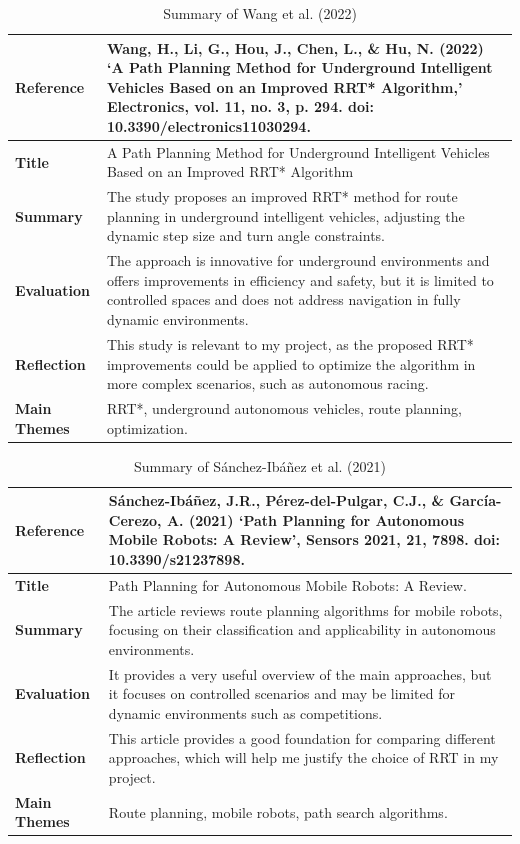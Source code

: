\documentclass[a4paper,11pt]{report}
\begin{document}
\begin{table}[H]
    \centering
    \begin{tabular}{|p{3cm}|p{10cm}|}
        \hline
        \textbf{Reference} & Wang, H., Li, G., Hou, J., Chen, L., \& Hu, N. (2022) ‘A Path Planning Method for Underground Intelligent Vehicles Based on an Improved RRT* Algorithm,’ Electronics, vol. 11, no. 3, p. 294. doi: 10.3390/electronics11030294. \\ \hline
        \textbf{Title} & A Path Planning Method for Underground Intelligent Vehicles Based on an Improved RRT* Algorithm \\ \hline
        \textbf{Summary} & The study proposes an improved RRT* method for route planning in underground intelligent vehicles, adjusting the dynamic step size and turn angle constraints. \\ \hline
        \textbf{Evaluation} & The approach is innovative for underground environments and offers improvements in efficiency and safety, but it is limited to controlled spaces and does not address navigation in fully dynamic environments. \\ \hline
        \textbf{Reflection} & This study is relevant to my project, as the proposed RRT* improvements could be applied to optimize the algorithm in more complex scenarios, such as autonomous racing. \\ \hline
        \textbf{Main Themes} & RRT*, underground autonomous vehicles, route planning, optimization. \\ \hline
    \end{tabular}
    \caption{Summary of Wang et al. (2022)}
    \label{tab:wang2022}
\end{table}

\begin{table}[H]
    \centering
    \begin{tabular}{|p{3cm}|p{10cm}|}
        \hline
        \textbf{Reference} & Sánchez-Ibáñez, J.R., Pérez-del-Pulgar, C.J., \& García-Cerezo, A. (2021) ‘Path Planning for Autonomous Mobile Robots: A Review’, Sensors 2021, 21, 7898. doi: 10.3390/s21237898. \\ \hline
        \textbf{Title} & Path Planning for Autonomous Mobile Robots: A Review. \\ \hline
        \textbf{Summary} & The article reviews route planning algorithms for mobile robots, focusing on their classification and applicability in autonomous environments. \\ \hline
        \textbf{Evaluation} & It provides a very useful overview of the main approaches, but it focuses on controlled scenarios and may be limited for dynamic environments such as competitions. \\ \hline
        \textbf{Reflection} & This article provides a good foundation for comparing different approaches, which will help me justify the choice of RRT in my project. \\ \hline
        \textbf{Main Themes} & Route planning, mobile robots, path search algorithms. \\ \hline
    \end{tabular}
    \caption{Summary of Sánchez-Ibáñez et al. (2021)}
    \label{tab:sanchez2021}
\end{table}
\end{document}
